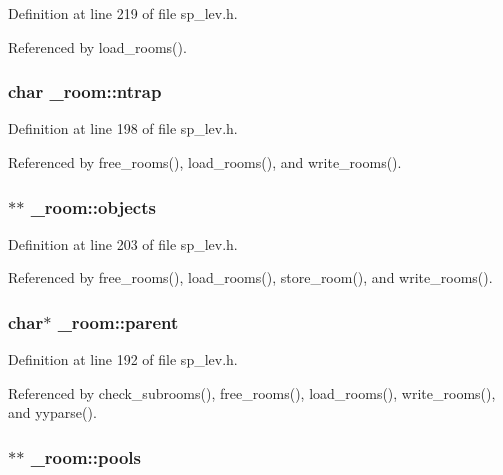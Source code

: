 Definition at line 219 of file sp\+\_\+lev.\+h.



Referenced by load\+\_\+rooms().

\hypertarget{struct__room_a8deec962297d6604afe7141d852413cc}{
\subsubsection[{ntrap}]{\setlength{\rightskip}{0pt plus 5cm}char \+\_\+room\+::ntrap}}\label{struct__room_a8deec962297d6604afe7141d852413cc}


Definition at line 198 of file sp\+\_\+lev.\+h.



Referenced by free\+\_\+rooms(), load\+\_\+rooms(), and write\+\_\+rooms().

\hypertarget{struct__room_a950a5ae5abd82208ba0ccaf95369c3ec}{
\subsubsection[{objects}]{$\ast$$\ast$ \+\_\+room\+::objects}}\label{struct__room_a950a5ae5abd82208ba0ccaf95369c3ec}


Definition at line 203 of file sp\+\_\+lev.\+h.



Referenced by free\+\_\+rooms(), load\+\_\+rooms(), store\+\_\+room(), and write\+\_\+rooms().

\hypertarget{struct__room_ad0c17b49155ae5f1517fa3227e0d48e6}{
\subsubsection[{parent}]{\setlength{\rightskip}{0pt plus 5cm}char$\ast$ \+\_\+room\+::parent}}\label{struct__room_ad0c17b49155ae5f1517fa3227e0d48e6}


Definition at line 192 of file sp\+\_\+lev.\+h.



Referenced by check\+\_\+subrooms(), free\+\_\+rooms(), load\+\_\+rooms(), write\+\_\+rooms(), and yyparse().

\hypertarget{struct__room_a671fd6f463544e5d1815524a2501fa4e}{
\subsubsection[{pools}]{$\ast$$\ast$ \+\_\+room\+::pools}}\label{struct__room_a671fd6f463544e5d1815524a2501fa4e}



